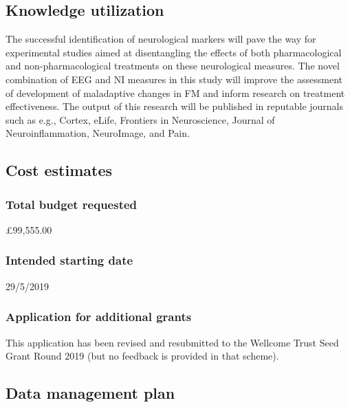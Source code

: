 \documentclass[twocolumn, serif, rga, numeric]{jote-article}
\begin{document}
\subsection*{Knowledge utilization}


The successful identification of neurological markers will pave the way
for experimental studies aimed at disentangling the effects of both
pharmacological and non-pharmacological treatments on these neurological
measures. The novel combination of EEG and NI measures in this study
will improve the assessment of development of maladaptive changes in FM
and inform research on treatment effectiveness. The output of this
research will be published in reputable journals such as e.g., Cortex,
eLife, Frontiers in Neuroscience, Journal of Neuroinflammation,
NeuroImage, and Pain.


\subsection*{Cost estimates}



\subsubsection*{Total budget requested}


£99,555.00


\subsubsection*{Intended starting date}


29/5/2019


\subsubsection*{Application for additional grants}


This application has been revised and resubmitted to the Wellcome Trust
Seed Grant Round 2019 (but no feedback is provided in that scheme).


\subsection*{Data management plan}
\end{document}

